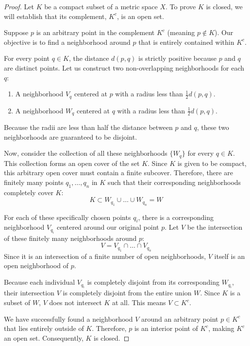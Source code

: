 \documentclass{article}
\theoremstyle{mythm}
\begin{document}
\begin{proof}
Let $K$ be a compact subset of a metric space $X$. To prove $K$ is closed, we will establish that its complement, $K^c$, is an open set.

Suppose $p$ is an arbitrary point in the complement $K^c$ (meaning $p \notin K$). Our objective is to find a neighborhood around $p$ that is entirely contained within $K^c$. 

For every point $q \in K$, the distance $d(p, q)$ is strictly positive because $p$ and $q$ are distinct points. Let us construct two non-overlapping neighborhoods for each $q$:
\begin{enumerate}
    \item A neighborhood $V_q$ centered at $p$ with a radius less than $\frac{1}{2} d(p, q)$.
    \item A neighborhood $W_q$ centered at $q$ with a radius less than $\frac{1}{2} d(p, q)$.
\end{enumerate}
Because the radii are less than half the distance between $p$ and $q$, these two neighborhoods are guaranteed to be disjoint.

Now, consider the collection of all these neighborhoods $\{W_q\}$ for every $q \in K$. This collection forms an open cover of the set $K$. Since $K$ is given to be compact, this arbitrary open cover must contain a finite subcover. Therefore, there are finitely many points $q_1, \dots, q_n$ in $K$ such that their corresponding neighborhoods completely cover $K$:
\[ K \subset W_{q_1} \cup \dots \cup W_{q_n} = W \]

For each of these specifically chosen points $q_i$, there is a corresponding neighborhood $V_{q_i}$ centered around our original point $p$. Let $V$ be the intersection of these finitely many neighborhoods around $p$:
\[ V = V_{q_1} \cap \dots \cap V_{q_n} \]
Since it is an intersection of a finite number of open neighborhoods, $V$ itself is an open neighborhood of $p$. 

Because each individual $V_{q_i}$ is completely disjoint from its corresponding $W_{q_i}$, their intersection $V$ is completely disjoint from the entire union $W$. Since $K$ is a subset of $W$, $V$ does not intersect $K$ at all. This means $V \subset K^c$. 

We have successfully found a neighborhood $V$ around an arbitrary point $p \in K^c$ that lies entirely outside of $K$. Therefore, $p$ is an interior point of $K^c$, making $K^c$ an open set. Consequently, $K$ is closed.
\end{proof}
\end{document}
